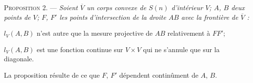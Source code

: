 \documentclass[11pt]{article}
\newenvironment{prop}[1][]{\par\medskip\noindent\textsc{Proposition #1.} --- \itshape}{\par\medskip}
\newenvironment{proof}[1][]{\par}{\par}
\begin{document}
\begin{prop}[2]
Soient $\overline{V}$ un corps convexe de $S(n)$ d'intérieur $V$; $A$, $B$ deux points de $V$;
$F$, $F'$ les points d'intersection de la droite $AB$ avec la frontière de $\overline{V}$ :

$l_V(A, B)$ n'est autre que la mesure projective de $AB$ relativement à $FF'$;

$l_V(A, B)$ est une fonction continue sur $V\times V$ qui ne s'annule que sur la diagonale.
\end{prop}

\begin{proof}
La proposition résulte de ce que $F$, $F'$ dépendent continûment de $A$, $B$.
\end{proof}

\end{document}
